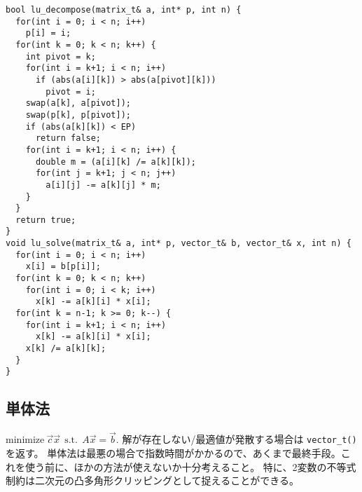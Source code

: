 \begin{lstlisting}
bool lu_decompose(matrix_t& a, int* p, int n) {
  for(int i = 0; i < n; i++)
    p[i] = i;
  for(int k = 0; k < n; k++) {
    int pivot = k;
    for(int i = k+1; i < n; i++)
      if (abs(a[i][k]) > abs(a[pivot][k]))
        pivot = i;
    swap(a[k], a[pivot]);
    swap(p[k], p[pivot]);
    if (abs(a[k][k]) < EP)
      return false;
    for(int i = k+1; i < n; i++) {
      double m = (a[i][k] /= a[k][k]);
      for(int j = k+1; j < n; j++)
        a[i][j] -= a[k][j] * m;
    }
  }
  return true;
}
void lu_solve(matrix_t& a, int* p, vector_t& b, vector_t& x, int n) {
  for(int i = 0; i < n; i++)
    x[i] = b[p[i]];
  for(int k = 0; k < n; k++)
    for(int i = 0; i < k; i++)
      x[k] -= a[k][i] * x[i];
  for(int k = n-1; k >= 0; k--) {
    for(int i = k+1; i < n; i++)
      x[k] -= a[k][i] * x[i];
    x[k] /= a[k][k];
  }
}
\end{lstlisting}


\subsection{単体法}

$\mathrm{minimize} ~ \vec{c} \vec{x} ~~ \mathrm{s.t.} ~~ A \vec{x} = \vec{b} $.
解が存在しない/最適値が発散する場合は \verb|vector_t()| を返す。
単体法は最悪の場合で指数時間がかかるので、あくまで最終手段。これを使う前に、ほかの方法が使えないか十分考えること。
特に、2変数の不等式制約は二次元の凸多角形クリッピングとして捉えることができる。

